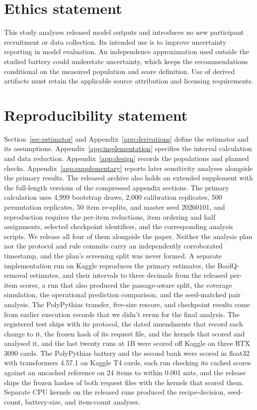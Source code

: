 \section*{Ethics statement}
This study analyses released model outputs and introduces no new participant recruitment or data collection. Its intended use is to improve uncertainty reporting in model evaluation. An independence approximation used outside the studied battery could understate uncertainty, which keeps the recommendations conditional on the measured population and score definition. Use of derived artifacts must retain the applicable source attribution and licensing requirements.

\section*{Reproducibility statement}
Section~\ref{sec:estimator} and Appendix~\ref{app:derivations} define the estimator and its assumptions. Appendix~\ref{app:implementation} specifies the interval calculation and data reduction. Appendix~\ref{app:design} records the populations and planned checks. Appendix~\ref{app:supplementary} reports later sensitivity analyses alongside the primary results. The released archive also holds an extended supplement with the full-length versions of the compressed appendix sections. The primary calculation uses 4,999 bootstrap draws, 2,000 calibration replicates, 500 permutation replicates, 50 item re-splits, and master seed 20260101, and reproduction requires the per-item reductions, item ordering and half assignments, selected checkpoint identifiers, and the corresponding analysis scripts. We release all four of them alongside the paper. Neither the analysis plan nor the protocol and rule commits carry an independently corroborated timestamp, and the plan's screening split was never formed. A separate implementation run on Kaggle reproduces the primary estimates, the BoolQ-removal estimates, and their intervals to three decimals from the released per-item scores, a run that also produced the passage-aware split, the coverage simulation, the operational prediction comparison, and the seed-matched pair analysis. The PolyPythias transfer, five-size rescore, and checkpoint results come from earlier execution records that we didn't rerun for the final analysis. The registered test ships with its protocol, the dated amendments that record each change to it, the frozen hash of its request file, and the kernels that scored and analysed it, and the last twenty runs at 1B were scored off Kaggle on three RTX 3090 cards. The PolyPythias battery and the second bank were scored in float32 with transformers 4.57.1 on Kaggle T4 cards, each run checking its cached scores against an uncached reference on 24 items to within 0.001 nats, and the release ships the frozen hashes of both request files with the kernels that scored them. Separate CPU kernels on the released runs produced the recipe-decision, seed-count, battery-size, and item-count analyses.

